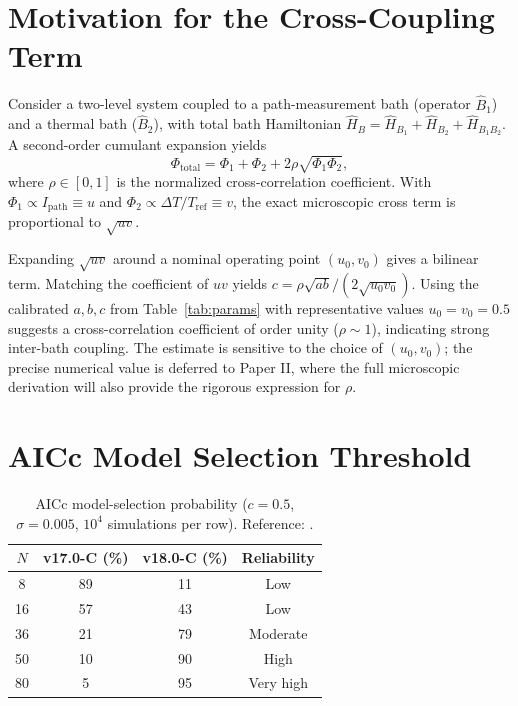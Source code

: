 \documentclass[aps,pra,reprint,amsmath,amssymb,superscriptaddress]{revtex4-2}
\begin{document}
\appendix

\section{Motivation for the Cross-Coupling Term}
\label{app:cumulant}
Consider a two-level system coupled to a path-measurement bath (operator $\hat{B}_1$) and a thermal bath ($\hat{B}_2$), with total bath Hamiltonian $\hat{H}_B = \hat{H}_{B_1} + \hat{H}_{B_2} + \hat{H}_{B_1 B_2}$. A second-order cumulant expansion yields
\begin{equation}
\Phi_{\text{total}} = \Phi_1 + \Phi_2 + 2\rho\sqrt{\Phi_1 \Phi_2},
\label{eq:cumulant}
\end{equation}
where $\rho \in [0, 1]$ is the normalized cross-correlation coefficient. With $\Phi_1 \propto I_{\text{path}} \equiv u$ and $\Phi_2 \propto \Delta T/T_{\text{ref}} \equiv v$, the exact microscopic cross term is proportional to $\sqrt{uv}$.

Expanding $\sqrt{uv}$ around a nominal operating point $(u_0, v_0)$ gives a bilinear term. Matching the coefficient of $uv$ yields $c = \rho\sqrt{ab}/(2\sqrt{u_0 v_0})$. Using the calibrated $a,b,c$ from Table~\ref{tab:params} with representative values $u_0 = v_0 = 0.5$ suggests a cross-correlation coefficient of order unity ($\rho \sim 1$), indicating strong inter-bath coupling. The estimate is sensitive to the choice of $(u_0, v_0)$; the precise numerical value is deferred to Paper II, where the full microscopic derivation will also provide the rigorous expression for $\rho$.

\section{AICc Model Selection Threshold}
\label{app:aicc}
\begin{table}[htbp]
\centering
\caption{AICc model-selection probability ($c=0.5$, $\sigma=0.005$, $10^4$ simulations per row). Reference: \cite{Burnham2002}.}
\label{tab:aicc}
\begin{tabular}{c c c c}
\toprule
$N$ & v17.0-C (\%) & v18.0-C (\%) & Reliability \\
\midrule
8 & 89 & 11 & Low \\
16 & 57 & 43 & Low \\
36 & 21 & 79 & Moderate \\
50 & 10 & 90 & High \\
80 & 5 & 95 & Very high \\
\bottomrule
\end{tabular}
\end{table}
\end{document}
